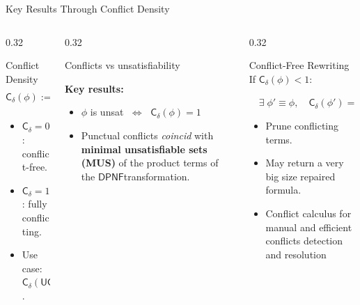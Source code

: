 \documentclass[9pt,aspectratio=169]{beamer}
\newcommand{\dpnf}{\ensuremath{\mathsf{DPNF}}}
\newcommand{\cd}{\ensuremath{\mathsf{C_\delta}}\xspace}
\newcommand{\UC}{\ensuremath{\mathsf{UC}}\xspace}
\begin{document}
\begin{frame}{Key Results Through Conflict Density}
\small
\begin{columns}[T]
  \begin{column}{0.32\textwidth}
  \begin{block}{Conflict Density}
    \[
    \cd(\phi) := \frac{|\text{CPT in } \dpnf(\phi)|}{|\text{PT in } \dpnf(\phi)|}
    \]
    \begin{itemize}\setlength\itemsep{2pt}
      \item $\cd = 0$: conflict-free.
      \item $\cd = 1$: fully conflicting.
      \item Use case: $\cd(\UC) = 75\%$.
    \end{itemize}
  \end{block}
\end{column}
\begin{column}{0.32\textwidth}
  \begin{block}{Conflicts vs unsatisfiability}
    \centering
    
    
    

    \raggedright
    \textbf{Key results:}
    \begin{itemize}\setlength\itemsep{2pt}
      \item $\phi$ is unsat $\;\Longleftrightarrow\;$ $\cd(\phi) = 1$
      \item Punctual conflicts \textit{coincid} with \textbf{minimal unsatisfiable sets (MUS)} of the product terms of the  \dpnf transformation.
    \end{itemize}
  \end{block}
\end{column}

\begin{column}{0.32\textwidth}
  \begin{block}{Conflict-Free Rewriting}
    If $\cd(\phi) < 1$:
    
      $\quad \exists\;\phi' \equiv \phi,\quad \cd(\phi') = 0$
    
    \begin{itemize}\setlength\itemsep{2pt}
      \item Prune conflicting terms.
      \item May return a very big size repaired formula.
      \item Conflict calculus for manual and efficient conflicts detection and resolution
    \end{itemize}
  \end{block}
\end{column}
\end{columns}
\end{frame}
\end{document}
